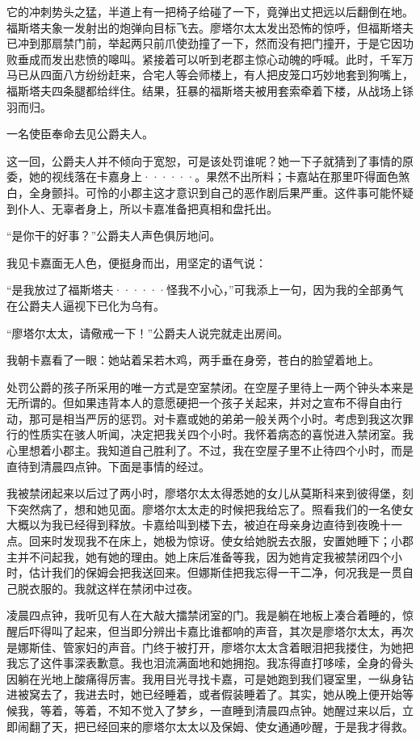 \documentclass[12pt, UTF8]{ctexbook}
\begin{document}
\par 它的冲刺势头之猛，半道上有一把椅子给碰了一下，竟弹出丈把远以后翻倒在地。福斯塔夫象一发射出的炮弹向目标飞去。廖塔尔太太发出恐怖的惊呼，但福斯塔夫已冲到那扇禁门前，举起两只前爪使劲撞了一下，然而没有把门撞开，于是它因功败垂成而发出悲愤的嗥叫。紧接着可以听到老郡主惊心动魄的呼喊。此时，千军万马已从四面八方纷纷赶来，合宅人等会师楼上，有人把皮笼口巧妙地套到狗嘴上，福斯塔夫四条腿都给绊住。结果，狂暴的福斯塔夫被用套索牵着下楼，从战场上铩羽而归。
\par 一名使臣奉命去见公爵夫人。
\par 这一回，公爵夫人并不倾向于宽恕，可是该处罚谁呢？她一下子就猜到了事情的原委，她的视线落在卡嘉身上······。果然不出所料；卡嘉站在那里吓得面色煞白，全身颤抖。可怜的小郡主这才意识到自己的恶作剧后果严重。这件事可能怀疑到仆人、无辜者身上，所以卡嘉准备把真相和盘托出。
\par “是你干的好事？”公爵夫人声色俱厉地问。
\par 我见卡嘉面无人色，便挺身而出，用坚定的语气说：
\par “是我放过了福斯塔夫······怪我不小心，”可我添上一句，因为我的全部勇气在公爵夫人逼视下已化为乌有。
\par “廖塔尔太太，请儆戒一下！”公爵夫人说完就走出房间。
\par 我朝卡嘉看了一眼：她站着呆若木鸡，两手垂在身旁，苍白的脸望着地上。
\par 处罚公爵的孩子所采用的唯一方式是空室禁闭。在空屋子里待上一两个钟头本来是无所谓的。但如果违背本人的意愿硬把一个孩子关起来，并对之宣布不得自由行动，那可是相当严厉的惩罚。对卡嘉或她的弟弟一般关两个小时。考虑到我这次罪行的性质实在骇人听闻，决定把我关四个小时。我怀着病态的喜悦进入禁闭室。我心里想着小郡主。我知道自己胜利了。不过，我在空屋子里不止待四个小时，而是直待到清晨四点钟。下面是事情的经过。
\par 我被禁闭起来以后过了两小时，廖塔尔太太得悉她的女儿从莫斯科来到彼得堡，刻下突然病了，想和她见面。廖塔尔太太走的时候把我给忘了。照看我们的一名使女大概以为我已经得到释放。卡嘉给叫到楼下去，被迫在母亲身边直待到夜晚十一点。回来时发现我不在床上，她极为惊讶。使女给她脱去衣服，安置她睡下；小郡主并不问起我，她有她的理由。她上床后准备等我，因为她肯定我被禁闭四个小时，估计我们的保姆会把我送回来。但娜斯佳把我忘得一干二净，何况我是一贯自己脱衣服的。我就这样在禁闭中过夜。
\par 凌晨四点钟，我听见有人在大敲大擂禁闭室的门。我是躺在地板上凑合着睡的，惊醒后吓得叫了起来，但当即分辨出卡嘉比谁都响的声音，其次是廖塔尔太太，再次是娜斯佳、管家妇的声音。门终于被打开，廖塔尔太太含着眼泪把我搂住，为她把我忘了这件事深表歉意。我也泪流满面地和她拥抱。我冻得直打哆嗦，全身的骨头因躺在光地上酸痛得厉害。我用目光寻找卡嘉，可是她跑到我们寝室里，一纵身钻进被窝去了，我进去时，她已经睡着，或者假装睡着了。其实，她从晚上便开始等候我，等着，等着，不知不觉入了梦乡，一直睡到清晨四点钟。她醒过来以后，立即闹翻了天，把已经回来的廖塔尔太太以及保姆、使女通通吵醒，于是我才得救。
\end{document}
